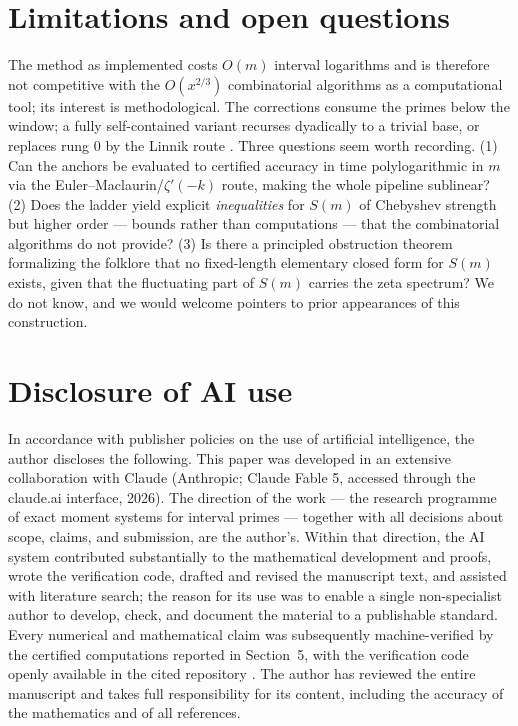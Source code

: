 \documentclass[11pt]{article}
\theoremstyle{remark}
\begin{document}
\section{Limitations and open questions}

The method as implemented costs $O(m)$ interval logarithms and is therefore not competitive with the
$O(x^{2/3})$ combinatorial algorithms \cite{DR,Orlov} as a computational tool; its interest is
methodological. The corrections consume the primes below the window; a fully self-contained variant
recurses dyadically to a trivial base, or replaces rung $0$ by the Linnik route
\cite{McKenzie,Companion}. Three questions seem
worth recording. (1) Can the anchors be evaluated to certified accuracy in time polylogarithmic in $m$
via the Euler--Maclaurin/$\zeta'(-k)$ route, making the whole pipeline sublinear? (2) Does the ladder
yield explicit \emph{inequalities} for $S(m)$ of Chebyshev strength but higher order --- bounds rather
than computations --- that the combinatorial algorithms do not provide? (3) Is there a principled
obstruction theorem formalizing the folklore that no fixed-length elementary closed form for $S(m)$
exists, given that the fluctuating part of $S(m)$ carries the zeta spectrum? We do not know, and we
would welcome pointers to prior appearances of this construction.

\section*{Disclosure of AI use}

In accordance with publisher policies on the use of artificial intelligence, the author discloses the
following. This paper was developed in an extensive collaboration with Claude (Anthropic; Claude Fable
5, accessed through the claude.ai interface, 2026). The direction of the work --- the research
programme of exact moment systems for interval primes --- together
with all decisions about scope, claims, and submission, are the author's. Within that direction, the
AI system contributed substantially to the mathematical development and proofs, wrote the verification
code, drafted and revised the manuscript text, and assisted with literature search; the reason for its
use was to enable a single non-specialist author to develop, check, and document the material to a
publishable standard. Every numerical and mathematical claim was subsequently machine-verified by the
certified computations reported in Section~5, with the verification code openly available in the cited
repository \cite{Code}. The author has reviewed the entire manuscript and takes full responsibility
for its content, including the accuracy of the mathematics and of all references.
\end{document}
